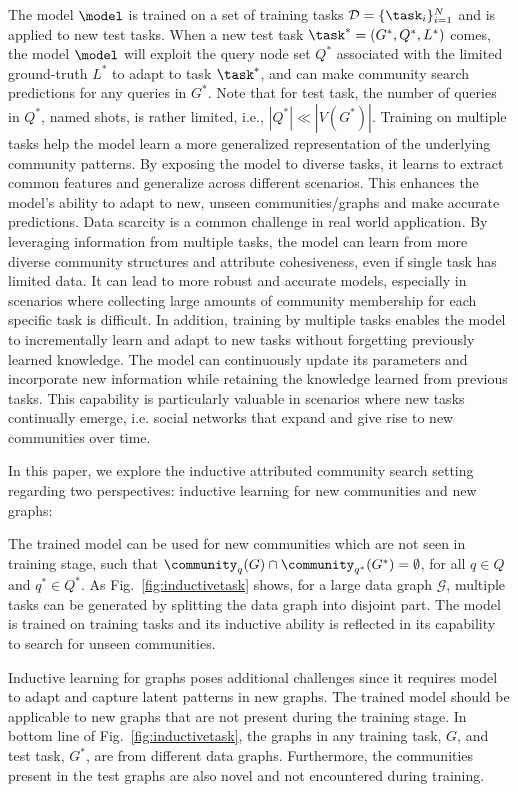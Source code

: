 The model $\model$ is trained on a set of training tasks $\mathcal{D} = \{ \task_i\}_{i = 1}^{N}$ and is applied to new test tasks.  
When a new test task $\task^*= (G^*, Q^*, L^*)$ comes, the model $\model$ will exploit the query node set $Q^*$ associated with the limited ground-truth $L^*$ to adapt to task $\task^*$, and can make community search predictions for any queries in $G^*$. Note that for test task, the number of queries in $Q^*$, named shots, is rather limited, i.e., $|Q^*| \ll |V(G^*)|$. 
Training on multiple tasks help the model learn a more generalized representation of the underlying community patterns. By exposing the model to diverse tasks, it learns to extract common features and generalize across different scenarios. This enhances the model's ability to adapt to new, unseen communities/graphs and make accurate predictions.
Data scarcity is a common challenge in real world application. By leveraging information from multiple tasks, the model can learn from more diverse community structures and attribute cohesiveness, even if single task has limited data. It can lead to more robust and accurate models, especially in scenarios where collecting large amounts of community membership for each specific task is difficult.
In addition, training by multiple tasks enables the model to incrementally learn and adapt to new tasks without forgetting previously learned knowledge. The model can continuously update its parameters and incorporate new information while retaining the knowledge learned from previous tasks. This capability is particularly valuable in scenarios where new tasks continually emerge, i.e. social networks that expand and give rise to new communities over time.

In this paper, we explore the inductive attributed community search setting regarding two perspectives: inductive learning for new communities and new graphs:

The trained model can be used for new communities which are not seen in training stage, such that $\community_{q}(G) \cap \community_{q^*}(G^*) = \emptyset$, for all $q \in Q$ and $q^* \in Q^*$. As Fig.~\ref{fig:inductivetask} shows, for a large data graph $\mathcal{G}$, multiple tasks can be generated by splitting the data graph into disjoint part. The model is trained on training tasks and its inductive ability is reflected in its capability to search for unseen communities.

Inductive learning for graphs poses additional challenges since it requires model to adapt and capture latent patterns in new graphs. The trained model should be applicable to new graphs that are not present during the training stage. In bottom line of Fig.~\ref{fig:inductivetask}, the graphs in any training task, $G$, and test task, $G^*$, are from different data graphs. Furthermore, the communities present in the test graphs are also novel and not encountered during training.



